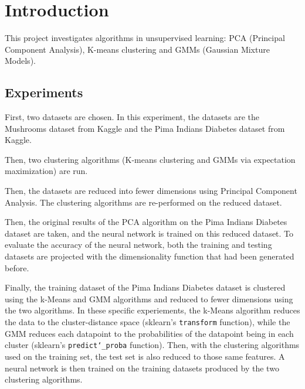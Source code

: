 \documentclass[11pt]{article}
\begin{document}
        \section{Introduction}
            
            This project investigates algorithms in unsupervised
            learning: PCA (Principal Component Analysis), K-means
            clustering and GMMs (Gaussian Mixture Models).

            \subsection{Experiments}
            
            First, two datasets are chosen. In this experiment, the datasets are the Mushrooms
            dataset from Kaggle and the Pima Indians Diabetes dataset from Kaggle.

            Then, two clustering algorithms (K-means clustering and GMMs via expectation maximization)
            are run.

            Then, the datasets are reduced into fewer dimensions using Principal Component Analysis.
            The clustering algorithms are re-performed on the reduced dataset.

            Then, the original results of the PCA algorithm on the Pima Indians
            Diabetes dataset are taken, and the neural network is trained on this reduced
            dataset. To evaluate the accuracy of the neural network, both the training
            and testing datasets are projected with the dimensionality function that had been generated
            before.


            Finally, the training dataset of the Pima Indians
            Diabetes dataset is clustered using the k-Means and GMM algorithms
            and reduced to fewer dimensions using the two algorithms. In these specific experiements, the k-Means
            algorithm reduces the data to the cluster-distance space (sklearn's \texttt{transform}
            function), while the GMM reduces each datapoint to the probabilities
            of the datapoint being in each cluster (sklearn's \texttt{predict\char`_proba} function).
            Then, with the clustering algorithms used on the training set,
            the test set is also reduced to those same features. A neural network
            is then trained on the training datasets produced by the two clustering
            algorithms.
           
\end{document}

